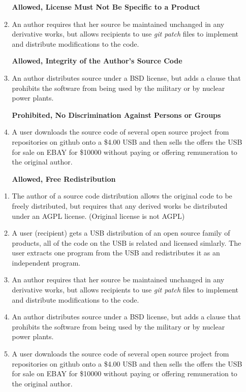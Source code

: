 \documentclass[10pt]{article}
\begin{document}
\begin{enumerate}
\begin{enumerate}
		\textbf{Allowed, License Must Not Be Specific to a Product}
		\bigskip
		\item An author requires that her source be maintained unchanged in any derivative works, but allows recipients to use \textit{git patch} files to implement and distribute modifications to the code.
		
		\textbf{Allowed, Integrity of the Author's Source Code}
		\bigskip
		\item An author distributes source under a BSD license, but adds a clause that prohibits the software from  being used by the military or by nuclear power plants.
		
		\textbf{Prohibited, No Discrimination Against Persons or Groups}
		\bigskip
		\item A user downloads the source code of several open source project from repositories on github onto a \$4.00 USB and then sells the offers the USB for sale on EBAY for \$10000 without paying or offering remuneration to the original author.

        \textbf{Allowed, Free Redistribution}
\bigskip
\end{enumerate}
\else
	\begin{enumerate}
	\item The author of a source code distribution allows the original code to be freely distributed, but requires that any derived works be distributed under an AGPL  license. (Original license is not AGPL)
	\bigskip
	\bigskip
	\bigskip
	\bigskip
	\bigskip
	\item A user (recipient) gets a USB distribution of an open source family of products, all of the code on the USB is related and licensed simlarly. The user extracts one program from the USB and redistributes it as an independent program.
	\bigskip
	\bigskip
	\bigskip
	\bigskip
	\bigskip
	\item An author requires that her source be maintained unchanged in any derivative works, but allows recipients to use \textit{git patch} files to implement and distribute modifications to the code.
	\bigskip
	\bigskip
	\bigskip
	\bigskip
	\bigskip
	\item An author distributes source under a BSD license, but adds a clause that prohibits the software from being used by the military or by nuclear power plants.
	\bigskip
	\bigskip
	\bigskip
	\bigskip
	\bigskip
	\item A user downloads the source code of several open source project from repositories on github onto a \$4.00 USB and then sells the offers the USB for sale on EBAY for \$10000 without paying or offering remuneration to the original author.
	\bigskip
	\bigskip
	\bigskip
	\bigskip
	\bigskip
\end{enumerate}
\fi
\newpage


\end{enumerate}
\end{document}
